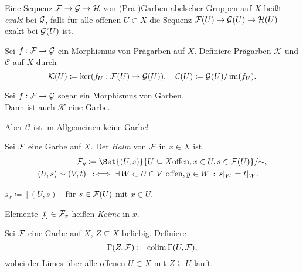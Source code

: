 \documentclass{cheat-sheet}
\begin{document}


\begin{defn}
  Eine Sequenz $\mathcal{F} \to \mathcal{G} \to \mathcal{H}$ von (Prä-)Garben abelscher Gruppen auf $X$ heißt \emph{exakt} bei $\mathcal{G}$, falls für alle offenen $U \subset X$ die Sequenz $\mathcal{F}(U) \to \mathcal{G}(U) \to \mathcal{H}(U)$ exakt bei $\mathcal{G}(U)$ ist.
\end{defn}

\begin{defn}
  Sei $f : \mathcal{F} \to \mathcal{G}$ ein Morphismus von Prägarben auf $X$. Definiere Prägarben $\mathcal{K}$ und $\mathcal{C}$ auf $X$ durch
  \[
    \mathcal{K}(U) \coloneqq \ker (f_U : \mathcal{F}(U) \to \mathcal{G}(U)), \quad
    \mathcal{C}(U) \coloneqq \mathcal{G}(U) / \operatorname{im} (f_U).
  \]
\end{defn}

\begin{prop}
  Sei $f : \mathcal{F} \to \mathcal{G}$ sogar ein Morphismus von Garben. \\
  Dann ist auch $\mathcal{K}$ eine Garbe.
\end{prop}

\begin{acht}
  Aber $\mathcal{C}$ ist im Allgemeinen keine Garbe!
\end{acht}


\begin{defn}
  Sei $\mathcal{F}$ eine Garbe auf $X$. Der \emph{Halm} von $\mathcal{F}$ in $x \in X$ ist
  \begin{align*}
    \Fais_y & \coloneqq \Set{(U, s)}{U \subseteq X \text{offen}, x \in U, s \in \Fais(U)} / {\sim}, \\
    (U, s) \sim (V, t) & \coloniff \ex{W \subset U \cap V \text{ offen}, y \in W} s|_W = t|_W.
  \end{align*}
\end{defn}

\begin{nota}
  $s_x \coloneqq [(U, s)]$ für $s \in \mathcal{F}(U)$ mit $x \in U$.
\end{nota}

\begin{sprech}
  Elemente $[t] \in \mathcal{F}_x$ heißen \emph{Keime} in $x$.
\end{sprech}

\begin{defn}
  Sei $\mathcal{F}$ eine Garbe auf $X$, $Z \subseteq X$ beliebig. Definiere
  \[ \Gamma(Z, \mathcal{F}) \coloneqq \operatorname{colim} \Gamma(U, \mathcal{F}), \]
  wobei der Limes über alle offenen $U \subset X$ mit $Z \subseteq U$ läuft.
\end{defn}
\end{document}
